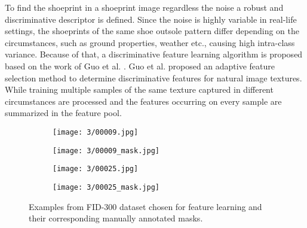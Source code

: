 \documentclass[draft,final]{vutinfth} %
\begin{document}
\par
To find the shoeprint in a shoeprint image regardless the noise a robust and discriminative descriptor is defined.
Since the noise is highly variable in real-life settings, the shoeprints of the same shoe outsole  pattern differ depending on the circumstances, such as ground properties, weather etc., causing high intra-class variance.
Because of that, a discriminative feature learning algorithm is proposed based on the work of Guo et al. \cite{guo2012discriminative}.
Guo et al. \cite{guo2012discriminative} proposed an adaptive feature selection method to determine discriminative features for natural image textures.
While training multiple samples of the same texture captured in different circumstances are processed and the features occurring on every sample are summarized in the feature pool.

\begin{figure}[h]
  \centering
  \begin{subfigure}[t]{0.24\columnwidth}
    \centering
    \texttt{[image: 3/00009.jpg]}
  \end{subfigure}
  \begin{subfigure}[t]{0.24\columnwidth}
    \centering
    \texttt{[image: 3/00009\_mask.jpg]}
  \end{subfigure}
  \begin{subfigure}[t]{0.24\columnwidth}
    \centering
    \texttt{[image: 3/00025.jpg]}
  \end{subfigure}
  \begin{subfigure}[t]{0.24\columnwidth}
    \centering
    \texttt{[image: 3/00025\_mask.jpg]}
  \end{subfigure}
  \caption{Examples from FID-300 \cite{kortylewski2014unsupervised} dataset chosen for feature learning and their corresponding manually annotated masks.}
  \label{fig:pe:mask}
\end{figure}
\end{document}
